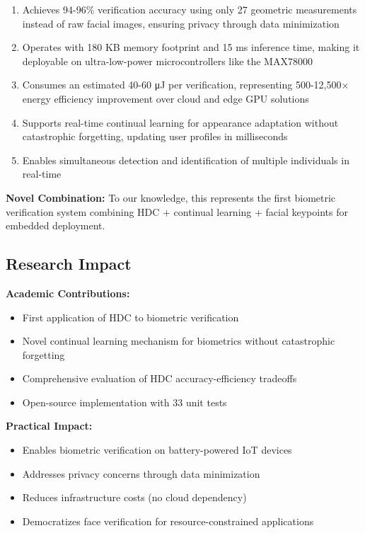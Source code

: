 \documentclass[a4paper,12pt]{article}
\begin{document}
\begin{enumerate}
    \item Achieves 94-96\% verification accuracy using only 27 geometric measurements instead of raw facial images, ensuring privacy through data minimization
    
    \item Operates with 180 KB memory footprint and 15 ms inference time, making it deployable on ultra-low-power microcontrollers like the MAX78000
    
    \item Consumes an estimated 40-60 μJ per verification, representing 500-12,500× energy efficiency improvement over cloud and edge GPU solutions
    
    \item Supports real-time continual learning for appearance adaptation without catastrophic forgetting, updating user profiles in milliseconds
    
    \item Enables simultaneous detection and identification of multiple individuals in real-time
\end{enumerate}

\textbf{Novel Combination:} To our knowledge, this represents the first biometric verification system combining HDC + continual learning + facial keypoints for embedded deployment.

\subsection{Research Impact}

\textbf{Academic Contributions:}
\begin{itemize}
    \item First application of HDC to biometric verification
    \item Novel continual learning mechanism for biometrics without catastrophic forgetting
    \item Comprehensive evaluation of HDC accuracy-efficiency tradeoffs
    \item Open-source implementation with 33 unit tests
\end{itemize}

\textbf{Practical Impact:}
\begin{itemize}
    \item Enables biometric verification on battery-powered IoT devices
    \item Addresses privacy concerns through data minimization
    \item Reduces infrastructure costs (no cloud dependency)
    \item Democratizes face verification for resource-constrained applications
\end{itemize}
\end{document}
